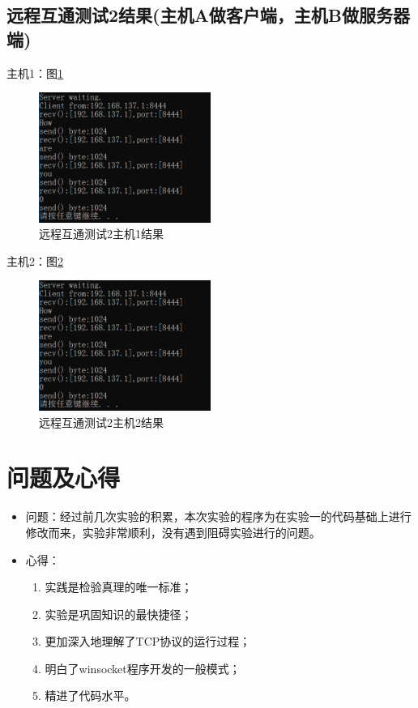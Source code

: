 \documentclass[a4paper]{ctexrep}
\begin{document}
\begin{spacing}{1.5}
\subsection{远程互通测试2结果(主机A做客户端，主机B做服务器端)}
主机1：图\ref{remote2local1}
\begin{figure}[htbp]
	\centering
	\includegraphics [width=0.5\textwidth]{figure//remote2local2.png}
	\caption{远程互通测试2主机1结果}\label{remote2local1}
\end{figure}

\newpage
主机2：图\ref{remote2local2}
\begin{figure}[htbp]
	\centering
	\includegraphics [width=0.5\textwidth]{figure//remote2local2.png}
	\caption{远程互通测试2主机2结果}\label{remote2local2}
\end{figure}

\end{spacing}
\section{问题及心得}
	\begin{itemize}
		\item 问题：经过前几次实验的积累，本次实验的程序为在实验一的代码基础上进行修改而来，实验非常顺利，没有遇到阻碍实验进行的问题。
		\item 心得：\begin{enumerate}
			\item 实践是检验真理的唯一标准；
			\item 实验是巩固知识的最快捷径；
			\item 更加深入地理解了TCP协议的运行过程；
			\item 明白了winsocket程序开发的一般模式；
			\item 精进了代码水平。
		\end{enumerate}
	\end{itemize}
\end{document}
